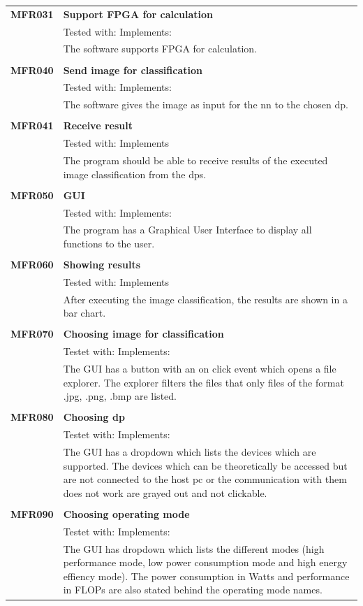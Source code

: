 \documentclass[parskip=full]{scrartcl}
\begin{document}
\begin{tabular}{p{2cm}p{12cm}}
\textbf {MFR031} & \textbf{Support FPGA for calculation} \\
& Tested with: Implements: \\
& The software supports FPGA for calculation. \\
& \\
\textbf {MFR040} & \textbf{Send image for classification} \\
& Tested with: Implements: \\
& The software gives the image as input for the \gls{nn} to the chosen \gls{dp}. \\
& \\
\textbf {MFR041} & \textbf{Receive result} \\
& Tested with: Implements \\
& The program should be able to receive results of the executed \gls{image classification} from the \glspl{dp}. \\
& \\
\textbf {MFR050} & \textbf{GUI} \\
& Tested with: Implements: \\
& The program has a Graphical User Interface to display all functions to the user. \\
& \\
\textbf {MFR060} & \textbf{Showing results} \\
& Tested with: Implements\\
& After executing the \gls{image classification}, the results are shown in a bar chart. \\
& \\
\textbf{MFR070} & \textbf{Choosing image for classification}\\
& Testet with: Implements: \\
& The GUI has a button with an on click event which opens a file explorer. The explorer filters the files that only files of the format .jpg, .png, .bmp are listed.\\
& \\
\textbf{MFR080} & \textbf{Choosing \gls{dp}}\\
& Testet with: Implements: \\
& The GUI has a dropdown which lists the devices which are supported. The devices which can be theoretically be accessed but are not connected to the \gls{host pc} or the communication with them does not work are grayed out and not clickable. \\
& \\
\textbf{MFR090} & \textbf{Choosing operating mode}\\
& Testet with: Implements: \\
& The GUI has dropdown which lists the different modes (high \gls{performance} mode, low \gls{power consumption} mode and high energy effiency mode). The \gls{power consumption} in Watts and \gls{performance} in FLOPs are also stated behind the operating mode names.
\end{tabular}
\end{document}
